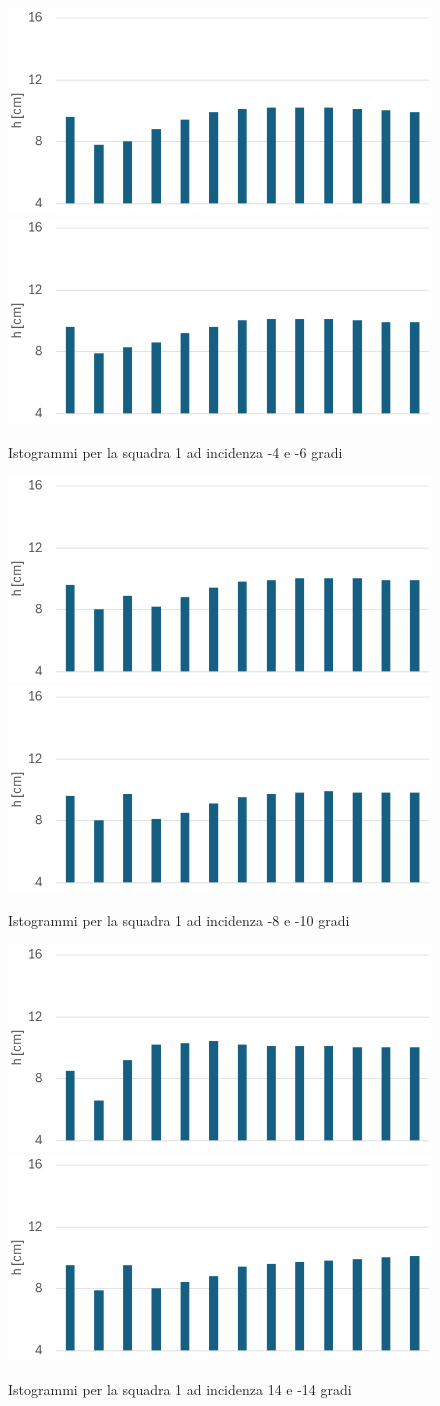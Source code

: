 \begin{figure}[H]
    \centering
    \includegraphics[width=.49\textwidth]{images/5/dsq1a-4.png}
    \includegraphics[width=.49\textwidth]{images/5/dsq1a-6.png}
    \caption{Istogrammi per la squadra 1 ad incidenza -4 e -6 gradi}
\end{figure}

\begin{figure}[H]
    \centering
    \includegraphics[width=.49\textwidth]{images/5/dsq1a-8.png}
    \includegraphics[width=.49\textwidth]{images/5/dsq1a-10.png}
    \caption{Istogrammi per la squadra 1 ad incidenza -8 e -10 gradi}
\end{figure}

\begin{figure}[H]
    \centering
    \includegraphics[width=.49\textwidth]{images/5/dsq1a14.png}
    \includegraphics[width=.49\textwidth]{images/5/dsq1a-14.png}
    \caption{Istogrammi per la squadra 1 ad incidenza 14 e -14 gradi}
\end{figure}

